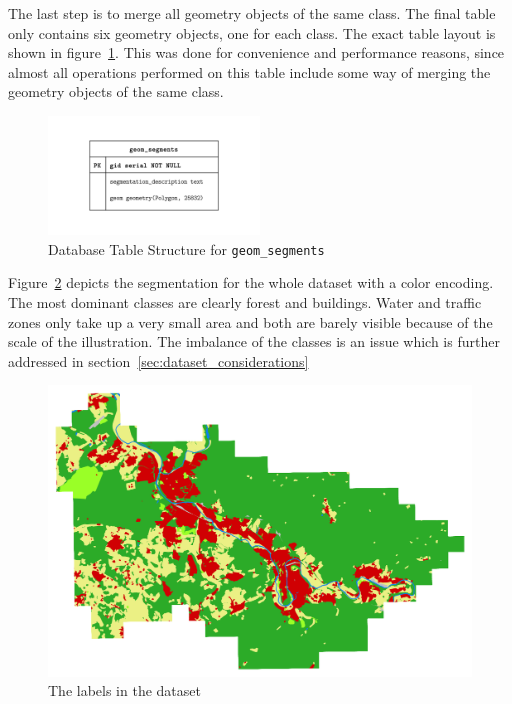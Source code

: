 The last step is to merge all geometry objects of the same class. The final table only contains six geometry objects, one for each class. The exact table layout is shown in figure~\ref{fig:geom_segments_entities}. This was done for convenience and performance reasons, since almost all operations performed on this table include some way of merging the geometry objects of the same class.

\begin{figure}[h]
    \centering
    \includegraphics[width=0.5\textwidth]{images/geom_segments_entities}
    \caption{Database Table Structure for \texttt{geom\_segments}}
    \label{fig:geom_segments_entities}
\end{figure}

Figure~\ref{fig:dop_label_all} depicts the segmentation for the whole dataset with a color encoding. The most dominant classes are clearly forest and buildings. Water and traffic zones only take up a very small area and both are barely visible because of the scale of the illustration. The imbalance of the classes is an issue which is further addressed in section~\ref{sec:dataset_considerations}

\begin{figure}[h]
    \centering
    \includegraphics[width=\textwidth]{images/dop_label_all}
    \caption{The labels in the dataset}
    \label{fig:dop_label_all}
\end{figure}

